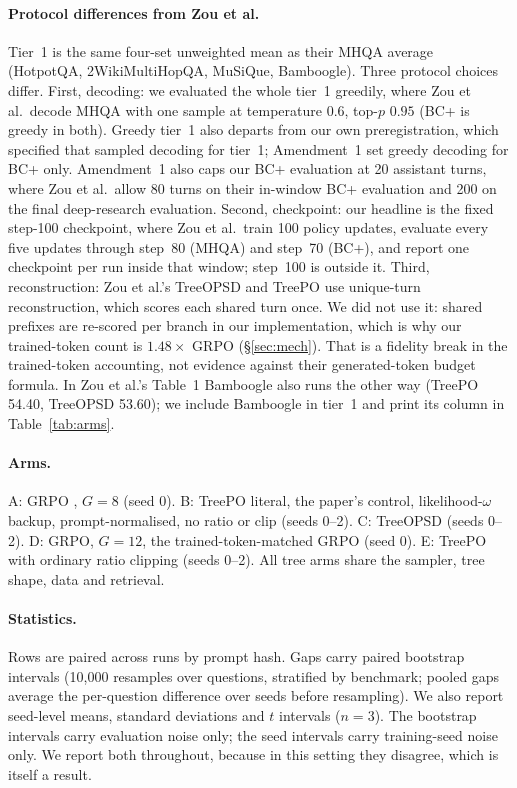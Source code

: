 \documentclass[11pt]{article}
\begin{document}
\paragraph{Protocol differences from Zou et al.} Tier~1 is the same
four-set unweighted mean as their MHQA average (HotpotQA,
2WikiMultiHopQA, MuSiQue, Bamboogle). Three protocol choices differ.
First, decoding: we evaluated the whole tier~1 greedily, where Zou et
al.\ decode MHQA with one sample at temperature $0.6$, top-$p$ $0.95$
(BC+ is greedy in both). Greedy tier~1 also departs from our own
preregistration, which specified that sampled decoding for tier~1;
Amendment~1 set greedy decoding for BC+ only. Amendment~1 also caps our
BC+ evaluation at 20 assistant turns, where Zou et al.\ allow 80 turns
on their in-window BC+ evaluation and 200 on the final deep-research
evaluation. Second, checkpoint: our headline is the fixed
step-100 checkpoint, where Zou et al.\ train 100 policy updates, evaluate
every five updates through step~80 (MHQA) and step~70 (BC+), and report
one checkpoint per run inside that window; step~100 is outside it.
Third, reconstruction: Zou et al.'s TreeOPSD and TreePO use unique-turn
reconstruction, which scores each shared turn once. We did not use it:
shared prefixes are re-scored per branch in our implementation, which
is why our trained-token count is $1.48\times$ GRPO (\S\ref{sec:mech}).
That is a fidelity break in the trained-token accounting, not evidence
against their generated-token budget formula. In Zou et al.'s Table~1
Bamboogle also runs the other way (TreePO 54.40, TreeOPSD 53.60); we
include Bamboogle in tier~1 and print its column in Table~\ref{tab:arms}.

\paragraph{Arms.} A: GRPO \cite{grpo}, $G=8$ (seed 0). B: TreePO literal, the paper's
control, likelihood-$\omega$ backup, prompt-normalised, no ratio or clip
(seeds 0--2). C: TreeOPSD (seeds 0--2). D: GRPO, $G=12$, the
trained-token-matched GRPO (seed 0). E: TreePO with ordinary ratio
clipping (seeds 0--2). All tree arms share the sampler, tree shape, data
and retrieval.

\paragraph{Statistics.} Rows are paired across runs by prompt hash.
Gaps carry paired bootstrap intervals (10{,}000 resamples over questions,
stratified by benchmark; pooled gaps average the per-question difference
over seeds before resampling). We also report seed-level means, standard
deviations and $t$ intervals ($n=3$). The bootstrap intervals carry
evaluation noise only; the seed intervals carry training-seed noise only.
We report both throughout, because in this setting they disagree, which
is itself a result.
\end{document}
